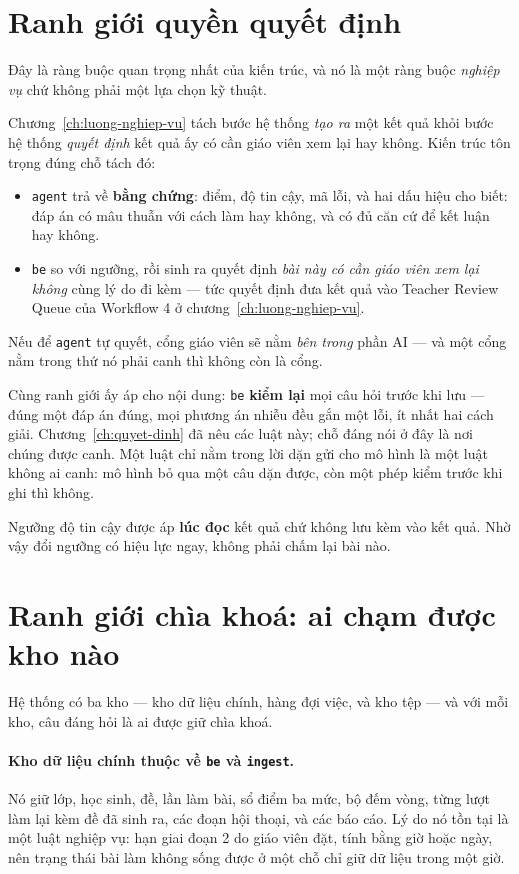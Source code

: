 \section{Ranh giới quyền quyết định}

Đây là ràng buộc quan trọng nhất của kiến trúc, và nó là một ràng buộc \emph{nghiệp vụ} chứ không
phải một lựa chọn kỹ thuật.

Chương~\ref{ch:luong-nghiep-vu} tách bước hệ thống \emph{tạo ra} một kết quả khỏi bước hệ thống
\emph{quyết định} kết quả ấy có cần giáo viên xem lại hay không. Kiến trúc tôn trọng đúng chỗ
tách đó:

\begin{itemize}
  \item \texttt{agent} trả về \textbf{bằng chứng}: điểm, độ tin cậy, mã lỗi, và hai dấu hiệu cho
        biết: đáp án có mâu thuẫn với cách làm hay không, và có đủ căn cứ để kết luận hay không.
  \item \texttt{be} so với ngưỡng, rồi sinh ra quyết định \emph{bài này có cần giáo viên xem lại
        không} cùng lý do đi kèm --- tức quyết định đưa kết quả vào Teacher Review Queue của
        Workflow 4 ở chương~\ref{ch:luong-nghiep-vu}.
\end{itemize}

Nếu để \texttt{agent} tự quyết, cổng giáo viên sẽ nằm \emph{bên trong} phần AI --- và một cổng
nằm trong thứ nó phải canh thì không còn là cổng.

Cùng ranh giới ấy áp cho nội dung: \texttt{be} \textbf{kiểm lại} mọi câu hỏi trước khi lưu ---
đúng một đáp án đúng, mọi phương án nhiễu đều gắn một lỗi, ít nhất hai cách giải.
Chương~\ref{ch:quyet-dinh} đã nêu các luật này; chỗ đáng nói ở đây là nơi chúng được canh. Một
luật chỉ nằm trong lời dặn gửi cho mô hình là một luật không ai canh: mô hình bỏ qua một câu dặn
được, còn một phép kiểm trước khi ghi thì không.

Ngưỡng độ tin cậy được áp \textbf{lúc đọc} kết quả chứ không lưu kèm vào kết quả. Nhờ vậy đổi
ngưỡng có hiệu lực ngay, không phải chấm lại bài nào.

\section{Ranh giới chìa khoá: ai chạm được kho nào}

Hệ thống có ba kho --- kho dữ liệu chính, hàng đợi việc, và kho tệp --- và với mỗi kho, câu
đáng hỏi là ai được giữ chìa khoá.

\paragraph{Kho dữ liệu chính thuộc về \texttt{be} và \texttt{ingest}.} Nó giữ lớp, học sinh, đề,
lần làm bài, sổ điểm ba mức, bộ đếm vòng, từng lượt làm lại kèm đề đã sinh ra, các đoạn hội
thoại, và các báo cáo. Lý do nó tồn tại là một luật nghiệp vụ: hạn giai đoạn 2 do giáo viên đặt,
tính bằng giờ hoặc ngày, nên trạng thái bài làm không sống được ở một chỗ chỉ giữ dữ liệu trong
một giờ.

